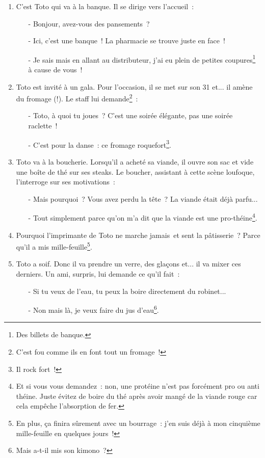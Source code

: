 \documentclass[10pt,a5paper,fullpage]{book}
\begin{document}
\begin{enumerate}
		\item C’est Toto qui va à la banque. Il se dirige vers l’accueil~:
		\begin{itemize}
			\item[-] Bonjour, avez-vous des pansements~?
			\item[-] Ici, c’est une banque~! La pharmacie se trouve juste en face~!
			\item[-] Je sais mais en allant au distributeur, j'ai eu plein de petites coupures\footnote{Des billets de banque.} à cause de vous~!
		\end{itemize}
		
		\item Toto est invité à un gala. Pour l'occasion, il se met sur son 31 et... il amène du fromage (!). Le staff lui demande\footnote{C'est fou comme ils en font tout un fromage~!}~:
		\begin{itemize}
			\item[-] Toto, à quoi tu joues~? C'est une soirée élégante, pas une soirée raclette~!
			\item[-] C'est pour la danse~: ce fromage roquefort\footnote{Il rock fort~!}.
		\end{itemize}
		
		\item Toto va à la boucherie. Lorsqu'il a acheté sa viande, il ouvre son sac et vide une boîte de thé sur ses steaks. Le boucher, assistant à cette scène loufoque, l'interroge sur ses motivations~:
		\begin{itemize}
			\item[-] Mais pourquoi~? Vous avez perdu la tête~? La viande était déjà parfu...
			\item[-] Tout simplement parce qu'on m'a dit que la viande est une pro-théine\footnote{Et si vous vous demandez~: non, une protéine n'est pas forcément pro ou anti théine. Juste évitez de boire du thé après avoir mangé de la viande rouge car cela empêche l'absorption de fer. }. 
		\end{itemize}
		
		\item Pourquoi l’imprimante de Toto ne marche jamais et sent la pâtisserie~? Parce qu’il a mis mille-feuille\footnote{En plus, ça finira sûrement avec un bourrage~: j'en suis déjà à mon cinquième mille-feuille en quelques jours~!}.
		
		\item Toto a soif. Donc il va prendre un verre, des glaçons et... il va mixer ces derniers. Un ami, surpris, lui demande ce qu'il fait~:
		\begin{itemize}
			\item[-] Si tu veux de l'eau, tu peux la boire directement du robinet...
			\item[-] Non mais là, je veux faire du jus d'eau\footnote{Mais a-t-il mis son kimono~?}. 
		\end{itemize}
	\end{enumerate}
	
\end{document}
